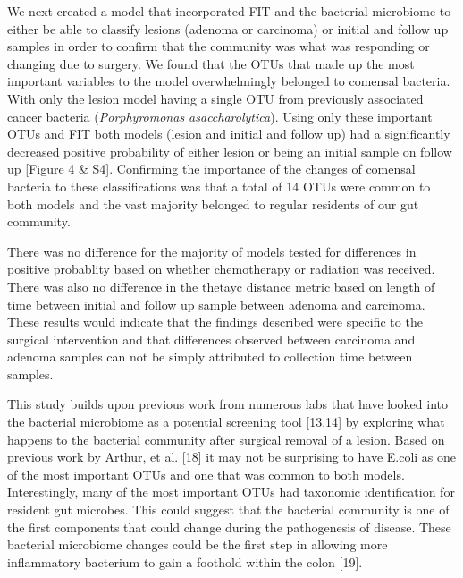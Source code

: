 \documentclass[12pt,]{article}
\begin{document}
We next created a model that incorporated FIT and the bacterial
microbiome to either be able to classify lesions (adenoma or carcinoma)
or initial and follow up samples in order to confirm that the community
was what was responding or changing due to surgery. We found that the
OTUs that made up the most important variables to the model
overwhelmingly belonged to comensal bacteria. With only the lesion model
having a single OTU from previously associated cancer bacteria
(\emph{Porphyromonas asaccharolytica}). Using only these important OTUs
and FIT both models (lesion and initial and follow up) had a
significantly decreased positive probability of either lesion or being
an initial sample on follow up {[}Figure 4 \& S4{]}. Confirming the
importance of the changes of comensal bacteria to these classifications
was that a total of 14 OTUs were common to both models and the vast
majority belonged to regular residents of our gut community.

There was no difference for the majority of models tested for
differences in positive probablity based on whether chemotherapy or
radiation was received. There was also no difference in the thetayc
distance metric based on length of time between initial and follow up
sample between adenoma and carcinoma. These results would indicate that
the findings described were specific to the surgical intervention and
that differences observed between carcinoma and adenoma samples can not
be simply attributed to collection time between samples.

This study builds upon previous work from numerous labs that have looked
into the bacterial microbiome as a potential screening tool {[}13,14{]}
by exploring what happens to the bacterial community after surgical
removal of a lesion. Based on previous work by Arthur, et al. {[}18{]}
it may not be surprising to have E.coli as one of the most important
OTUs and one that was common to both models. Interestingly, many of the
most important OTUs had taxonomic identification for resident gut
microbes. This could suggest that the bacterial community is one of the
first components that could change during the pathogenesis of disease.
These bacterial microbiome changes could be the first step in allowing
more inflammatory bacterium to gain a foothold within the colon
{[}19{]}.
\end{document}
